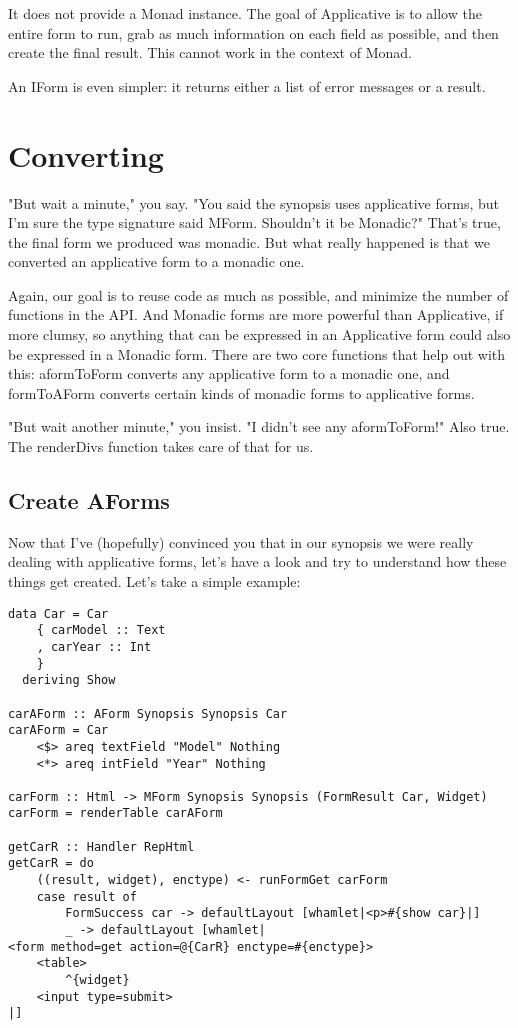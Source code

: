 It does not provide a Monad instance. The goal of Applicative is to allow the entire form to run, grab as much information on each field as possible, and then create the final result. This cannot work in the context of Monad.

An IForm is even simpler: it returns either a list of error messages or a result.

\section{Converting}

"But wait a minute," you say. "You said the synopsis uses applicative forms, but I'm sure the type signature said MForm. Shouldn't it be Monadic?" That's true, the final form we produced was monadic. But what really happened is that we converted an applicative form to a monadic one.

Again, our goal is to reuse code as much as possible, and minimize the number of functions in the API. And Monadic forms are more powerful than Applicative, if more clumsy, so anything that can be expressed in an Applicative form could also be expressed in a Monadic form. There are two core functions that help out with this: aformToForm converts any applicative form to a monadic one, and formToAForm converts certain kinds of monadic forms to applicative forms.

"But wait another minute," you insist. "I didn't see any aformToForm!" Also true. The renderDivs function takes care of that for us.

\subsection{Create AForms}

Now that I've (hopefully) convinced you that in our synopsis we were really dealing with applicative forms, let's have a look and try to understand how these things get created. Let's take a simple example:

\begin{lstlisting}
data Car = Car
    { carModel :: Text
    , carYear :: Int
    }
  deriving Show

carAForm :: AForm Synopsis Synopsis Car
carAForm = Car
    <$> areq textField "Model" Nothing
    <*> areq intField "Year" Nothing

carForm :: Html -> MForm Synopsis Synopsis (FormResult Car, Widget)
carForm = renderTable carAForm

getCarR :: Handler RepHtml
getCarR = do
    ((result, widget), enctype) <- runFormGet carForm
    case result of
        FormSuccess car -> defaultLayout [whamlet|<p>#{show car}|]
        _ -> defaultLayout [whamlet|
<form method=get action=@{CarR} enctype=#{enctype}>
    <table>
        ^{widget}
    <input type=submit>
|]
\end{lstlisting}

